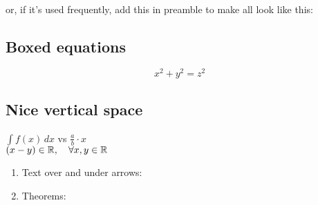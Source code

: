 \\
or, if it's used frequently, add this in preamble to make all look like this:\\
\code{\usepackage[intlimits]{amsmath}}

\subsection*{Boxed equations}

\begin{example}
\begin{equation}
 \boxed{x^2+y^2 = z^2}
\end{equation}
\end{example}

\begin{example}

\end{example}

\subsection*{Nice vertical space}
\begin{example}
\centering
$\int f(x)\,dx$ vs $\frac{a}{b} \cdot x$\\
$(x - y) \in \mathbb{R}, \quad \forall x, y \in \mathbb{R}$
\end{example}

\begin{enumerate}
\item Text over and under arrows:\\
\item Theorems:
\end{enumerate}



